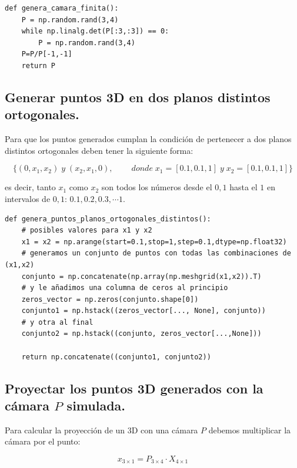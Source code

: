 \documentclass[11pt,a4paper]{article}
\theoremstyle{plain}
\theoremstyle{definition}
\begin{document}
\begin{verbatim}
def genera_camara_finita():
    P = np.random.rand(3,4)
    while np.linalg.det(P[:3,:3]) == 0:
        P = np.random.rand(3,4)
    P=P/P[-1,-1]
    return P
\end{verbatim}

\subsection{Generar puntos 3D en dos planos distintos ortogonales.}

Para que los puntos generados cumplan la condición de pertenecer a dos planos distintos ortogonales deben tener la siguiente forma:

\begin{displaymath}
\{(0,x_1,x_2)\;y\;(x_2,x_1,0), \qquad\ donde\;x_1 = [0.1,0.1,1]\;y\;x_2=[0.1,0.1,1]\}
\end{displaymath}

es decir, tanto $x_1$ como $x_2$ son todos los números desde el $0,1$ hasta el $1$ en intervalos de $0,1$: $0.1, 0.2, 0.3, \cdots 1$.

\begin{verbatim}
def genera_puntos_planos_ortogonales_distintos():
    # posibles valores para x1 y x2
    x1 = x2 = np.arange(start=0.1,stop=1,step=0.1,dtype=np.float32)
    # generamos un conjunto de puntos con todas las combinaciones de (x1,x2)
    conjunto = np.concatenate(np.array(np.meshgrid(x1,x2)).T)
    # y le añadimos una columna de ceros al principio
    zeros_vector = np.zeros(conjunto.shape[0])
    conjunto1 = np.hstack((zeros_vector[..., None], conjunto))
    # y otra al final
    conjunto2 = np.hstack((conjunto, zeros_vector[...,None]))

    return np.concatenate((conjunto1, conjunto2))
\end{verbatim}

\subsection{Proyectar los puntos 3D generados con la cámara $P$ simulada.}

Para calcular la proyección de un 3D con una cámara $P$ debemos multiplicar la cámara por el punto:

\begin{displaymath}
x_{3 \times 1} = P_{3 \times 4} \cdot X_{4 \times 1}
\end{displaymath}
\end{document}
